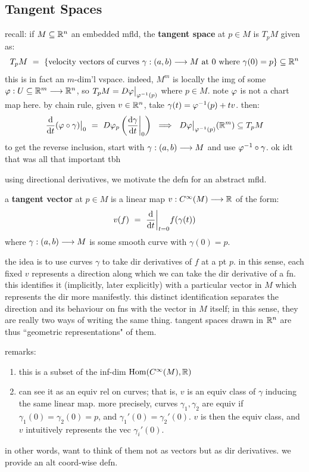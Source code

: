 \subsection{Tangent Spaces}


recall: if $M\subseteq\mathbb{R}^{n}$ an embedded mfld, the \textbf{tangent space}
at $p\in M$ is $T_{p}M$ given as:
\begin{equation*}
	T_{p}M \ = \ \left\{{\textrm{velocity vectors of curves } \gamma:(a,b)\longrightarrow M
	\textrm{ at } 0 \textrm{ where } \gamma(0)=p}\right\} \subseteq \mathbb{R}^{n}
\end{equation*}
this is in fact an $m$-dim'l vspace.
indeed, $M^{m}$ is locally the img of some $\varphi:U\subseteq\mathbb{R}^{m}\longrightarrow\mathbb{R}^{n}$,
so $T_{p}M=D\varphi\big\rvert_{\varphi^{-1}(p)}$ where $p\in M$.
note $\varphi$ is not a chart map here.
by chain rule, given $v\in\mathbb{R}^{n}$, take $\gamma(t)=\varphi^{-1}(p)+tv$. then:
\begin{equation*}
	\frac{\textrm{d}}{\textrm{d} t}(\varphi\circ\gamma)\big\rvert_{0}
	\ = \ D\varphi_{p}\left(\frac{\textrm{d}\gamma}{\textrm{d} t}\bigg\rvert_{0}\right)
	\ \implies \ D\varphi\big\rvert_{\varphi^{-1}(p)}(\mathbb{R}^{m})\subseteq T_{p}M
\end{equation*}
to get the reverse inclusion, start with $\gamma:(a,b)\longrightarrow M$ and
use $\varphi^{-1}\circ\gamma$. ok idt that was all that important tbh

using directional derivatives, we motivate the defn for an abstract mfld.
\begin{defn}
	a \textbf{tangent vector} at $p\in M$ is a linear map $v:C^{\infty}(M)\longrightarrow\mathbb{R}$
	of the form:
	\begin{equation*}
		v(f) \ = \ \frac{\textrm{d}}{\textrm{d} t}\bigg\rvert_{t=0}f(\gamma(t))
	\end{equation*}
	where $\gamma:(a,b)\longrightarrow M$ is some smooth curve with $\gamma(0)=p$.
\end{defn}
the idea is to use curves $\gamma$ to take dir derivatives of $f$ at a pt $p$.
in this sense, each fixed $v$ represents a direction along which we can
take the dir derivative of a fn.
this identifies it (implicitly, later explicitly) with a particular vector in $M$
which represents the dir more manifestly.
this distinct identification separates the direction and its behaviour on fns
with the vector in $M$ itself; in this sense, they are really two ways of writing the same thing.
tangent spaces drawn in $\mathbb{R}^{n}$ are thus ``geometric representations" of them.

remarks:
\begin{enumerate}
	\item this is a subset of the inf-dim $\operatorname{Hom}(C^{\infty}(M),\mathbb{R})$
	\item can see it as an equiv rel on curves; that is, $v$ is an equiv class
		of $\gamma$ inducing the same linear map.
		more precisely, curves $\gamma_{1},\gamma_{2}$ are equiv if $\gamma_{1}(0)=\gamma_{2}(0)=p$,
		and $\gamma_{1}'(0)=\gamma_{2}'(0)$. $v$ is then the equiv class, and $v$ intuitively
		represents the vec $\gamma_{i}'(0)$.
\end{enumerate}
in other words, want to think of them not as vectors but as dir derivatives.
we provide an alt coord-wise defn.

